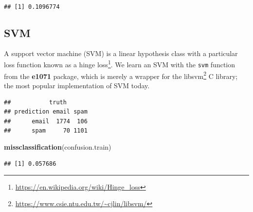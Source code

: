\documentclass[]{book}
\newenvironment{Shaded}{\begin{snugshade}}{\end{snugshade}}
\newcommand{\CommentTok}[1]{\textcolor[rgb]{0.56,0.35,0.01}{\textit{#1}}}
\newcommand{\DataTypeTok}[1]{\textcolor[rgb]{0.13,0.29,0.53}{#1}}
\newcommand{\FloatTok}[1]{\textcolor[rgb]{0.00,0.00,0.81}{#1}}
\newcommand{\KeywordTok}[1]{\textcolor[rgb]{0.13,0.29,0.53}{\textbf{#1}}}
\newcommand{\NormalTok}[1]{#1}
\newcommand{\OperatorTok}[1]{\textcolor[rgb]{0.81,0.36,0.00}{\textbf{#1}}}
\newcommand{\StringTok}[1]{\textcolor[rgb]{0.31,0.60,0.02}{#1}}
\renewcommand{\href}[2]{#2\footnote{\url{#1}}}
\theoremstyle{definition}
\theoremstyle{definition}
\theoremstyle{definition}
\theoremstyle{remark}
\begin{document}
\begin{verbatim}
## [1] 0.1096774
\end{verbatim}

\hypertarget{svm}{%
\subsection{SVM}\label{svm}}

A support vector machine (SVM) is a linear hypothesis class with a particular loss function known as a \href{https://en.wikipedia.org/wiki/Hinge_loss}{hinge loss}.
We learn an SVM with the \texttt{svm} function from the \textbf{e1071} package, which is merely a wrapper for the \href{https://www.csie.ntu.edu.tw/~cjlin/libsvm/}{libsvm} C library; the most popular implementation of SVM today.

\begin{Shaded}
\end{Shaded}

\begin{verbatim}
##           truth
## prediction email spam
##      email  1774  106
##      spam     70 1101
\end{verbatim}

\begin{Shaded}
\begin{Highlighting}[]
\KeywordTok{missclassification}\NormalTok{(confusion.train)}
\end{Highlighting}
\end{Shaded}

\begin{verbatim}
## [1] 0.057686
\end{verbatim}

\begin{Shaded}
\end{Shaded}
\end{document}
